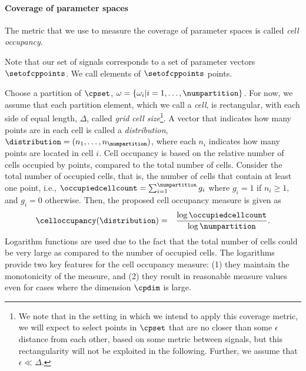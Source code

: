 \paragraph{Coverage of parameter spaces}	

The metric that we use to measure the coverage of parameter spaces is called {\em cell occupancy}. 

%

Note that our set of signals corresponds
to a set of parameter vectors $\setofcppoints$. We call elements of
$\setofcppoints$ points. %

Choose a partition of $\cpset$, $\omega=\{ \omega_i | i=1,\ldots,
\numpartition \}$. For now, we assume that each partition element,
which we call a \emph{cell}, is rectangular, with each side of equal
length, $\Delta$, called \emph{grid cell size}\footnote{We note that
  in the setting in which we intend to apply this coverage
  metric, we will expect to select points in $\cpset$ that are no
  closer than some $\epsilon$ distance from each other, based on some
  metric between signals, but this rectangularity will not be exploited in
  the following. Further, we assume that $\epsilon\ll\Delta$.}. A
vector that indicates how many points are in each cell is called a
\emph{distribution}, $\distribution=(n_1,\ldots,n_\numpartition)$,
where each $n_i$ indicates how many points are located in cell $i$.
Cell occupancy is based on the relative number of cells occupied by
points, compared to the total number of cells. Consider the total
number of occupied cells, that is, the number of cells that contain
at least one point, i.e., $\occupiedcellcount =  \sum_{i=1}^{\numpartition} g_i$  
where $g_i = 1$ if  $n_i\geq 1$, and $g_i = 0$ otherwise. Then, the proposed cell occupancy measure is given as
\begin{eqnarray*}
\celloccupancy(\distribution) & = & \frac{\log \occupiedcellcount}{\log \numpartition}.
\end{eqnarray*}
Logarithm functions are used due to the fact that the total number of cells could be very large as compared to the number of occupied cells. The logarithms provide two key features for the cell occupancy measure: (1) they maintain the monotonicity of the measure, and (2) they result in reasonable measure values even for cases where the dimension $\cpdim$ is  large.  
